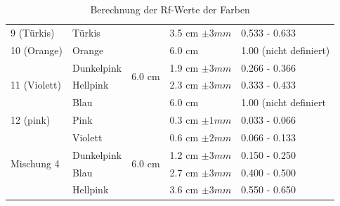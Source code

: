 \documentclass[11pt,paper=a4,final]{scrartcl}
\begin{document}
\begin{savenotes}
\begin{table}[ht!]
\begin{tabular}{|l|l|l|l|l|}
      9 (T\"urkis)	& T\"urkis	& \multirow{6}{*}{6.0 cm }	& 3.5 cm \(\pm 3 mm \)	& 0.533 - 0.633		\\ \cline{1-2} \cline{4-5}
       10 (Orange)	& Orange	& 				& 6.0 cm		& 1.00 (nicht definiert)\\ \cline{1-2} \cline{4-5}
      \multirow{3}{*}{11 (Violett)}
      			& Dunkelpink	&				& 1.9 cm \(\pm 3 mm \)	& 0.266 - 0.366		\\
      			& Hellpink	&				& 2.3 cm \(\pm 3 mm \)	& 0.333 - 0.433		\\
      			& Blau		&				& 6.0 cm		& 1.00 (nicht definiert \\ \cline{1-2} \cline{4-5}
      12 (pink)		& Pink		&				& 0.3 cm \(\pm 1 mm \)	& 0.033 - 0.066		\\ \hline
      \multirow{4}{*}{Mischung 4}
      			& Violett	& \multirow{4}{*}{6.0 cm }	& 0.6 cm \(\pm 2 mm \)	& 0.066 - 0.133		\\
      			& Dunkelpink	&				& 1.2 cm \(\pm 3 mm \)	& 0.150 - 0.250		\\
			& Blau		& 				& 2.7 cm \(\pm 3 mm \)	& 0.400 - 0.500		\\
      			& Hellpink	& 				& 3.6 cm \(\pm 3 mm \)	& 0.550 - 0.650		\\ \hline
      	
    \end{tabular}
    \caption{Berechnung der Rf-Werte der Farben}
    \end{table}
\end{savenotes}

\newpage
\end{document}
